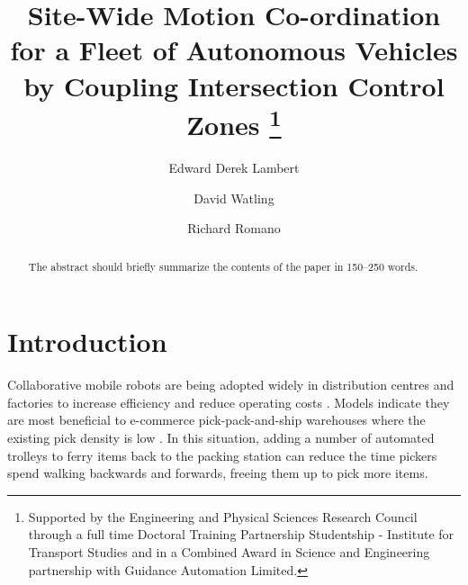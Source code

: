 \documentclass[runningheads]{llncs}
\begin{document}
%
\title{Site-Wide Motion Co-ordination for a Fleet of Autonomous Vehicles by Coupling Intersection Control Zones %
\thanks{Supported by the Engineering and Physical Sciences Research Council  through a full time Doctoral Training Partnership Studentship - Institute for Transport Studies and in a Combined Award in Science and Engineering partnership with Guidance Automation Limited. }}
%
%
\author{Edward Derek Lambert \and
David Watling   \and
Richard Romano}
%
%
%
\maketitle              %
%
\begin{abstract}
The abstract should briefly summarize the contents of the paper in
150--250 words.

\end{abstract}
%
%
%
%
%
\section{Introduction}
Collaborative mobile robots are being adopted widely in distribution centres and factories to increase efficiency and reduce operating costs \cite{Azadeh2019}. Models indicate they are most beneficial to e-commerce pick-pack-and-ship warehouses where the existing pick density is low \cite{Meller2018}. In this situation, adding a number of automated trolleys to ferry items back to the packing station can reduce the time pickers spend walking backwards and forwards, freeing them up to pick more items.
\end{document}
